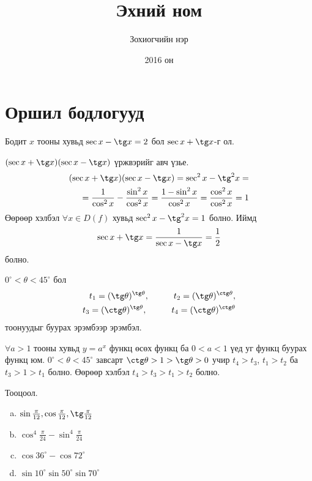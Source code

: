 \documentclass[10pt,a4paper,oneside]{book}
\begin{document}
\title{Эхний ном}
\author{Зохиогчийн нэр}
\date{2016 он}
\maketitle
\chapter{Оршил бодлогууд}

\Problem Бодит $x$ тооны хувьд $\sec x - \tg x = 2$ бол $\sec x + \tg x$-г ол.

\TheSolution
$(\sec x + \tg x)(\sec x - \tg x)$ үржвэрийг авч үзье.
\begin{equation*}
\begin{split}
(\sec x + \tg x)(\sec x - \tg x)= \sec^2 x - \tg^2 x =\\
= \frac{1}{\cos^2 x} - \frac{\sin^2 x}{\cos^2 x}
= \frac{1-\sin^2 x}{\cos^2 x} = \frac{\cos^2 x}{\cos^2 x} = 1
\end{split}
\end{equation*}
Өөрөөр хэлбэл $\forall x \in D(f)$ хувьд $\sec^2 x - \tg^2 x = 1$ болно. Иймд 
\begin{equation*}
\sec x + \tg x = \frac{1}{\sec x - \tg x} = \frac{1}{2}
\end{equation*}
 болно.
 
\Problem $0^{\circ}<\theta< 45^{\circ}$ бол
\begin{equation*}
\begin{split}
t_1 = (\tg\theta)^{\tg\theta},\hspace{1cm} t_2 = (\tg\theta)^{\ctg\theta},\\
t_3 = (\ctg\theta)^{\tg\theta},\hspace{1cm} t_4 = (\ctg\theta)^{\ctg\theta}
\end{split}
\end{equation*}
тоонуудыг буурах эрэмбээр эрэмбэл.

\TheSolution
$\forall a > 1$ тооны хувьд $y=a^x$  функц өсөх функц ба $0 < a < 1$ үед уг функц буурах функц юм. $0^{\circ} < \theta < 45^{\circ}$ завсарт $\ctg\theta > 1 > \tg\theta > 0$ учир  $t_4 > t_3$, $t_1 > t_2$ ба $t_3 > 1 > t_1$ болно. Өөрөөр хэлбэл $t_4 > t_3 > t_1 > t_2$ болно.

\Problem Тооцоол.
\begin{enumerate}[(a)]
\item $\sin\frac{\pi}{12}, \cos\frac{\pi}{12}, \tg\frac{\pi}{12}$
\item $\cos^4\frac{\pi}{24}-\sin^4\frac{\pi}{24}$
\item $\cos 36^\circ - \cos 72^\circ$
\item $\sin 10^\circ \sin 50^\circ\sin 70^\circ$
\end{enumerate}
\end{document}
